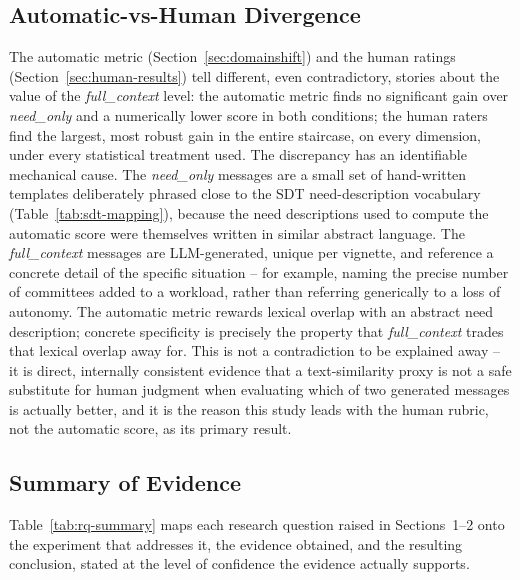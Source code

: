 \documentclass[higheredu,article,submit,pdftex,moreauthors]{Definitions/mdpi}
\begin{document}
\subsection{Automatic-vs-Human Divergence}
\label{sec:divergence}

The automatic metric (Section~\ref{sec:domainshift}) and the human ratings (Section~\ref{sec:human-results}) tell different, even contradictory, stories about the value of the \textit{full\_context} level: the automatic metric finds no significant gain over \textit{need\_only} and a numerically lower score in both conditions; the human raters find the largest, most robust gain in the entire staircase, on every dimension, under every statistical treatment used. The discrepancy has an identifiable mechanical cause. The \textit{need\_only} messages are a small set of hand-written templates deliberately phrased close to the SDT need-description vocabulary (Table~\ref{tab:sdt-mapping}), because the need descriptions used to compute the automatic score were themselves written in similar abstract language. The \textit{full\_context} messages are LLM-generated, unique per vignette, and reference a concrete detail of the specific situation -- for example, naming the precise number of committees added to a workload, rather than referring generically to a loss of autonomy. The automatic metric rewards lexical overlap with an abstract need description; concrete specificity is precisely the property that \textit{full\_context} trades that lexical overlap away for. This is not a contradiction to be explained away -- it is direct, internally consistent evidence that a text-similarity proxy is not a safe substitute for human judgment when evaluating which of two generated messages is actually better, and it is the reason this study leads with the human rubric, not the automatic score, as its primary result.

\subsection{Summary of Evidence}

Table~\ref{tab:rq-summary} maps each research question raised in Sections~1--2 onto the experiment that addresses it, the evidence obtained, and the resulting conclusion, stated at the level of confidence the evidence actually supports.
\end{document}
